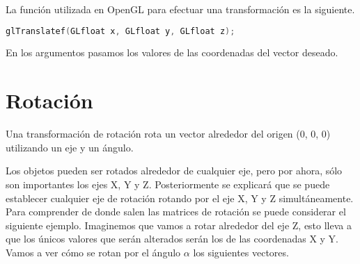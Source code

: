 La función utilizada en OpenGL para efectuar una transformación es la siguiente.
\begin{lstlisting}[language=C]
  glTranslatef(GLfloat x, GLfloat y, GLfloat z);
\end{lstlisting}
En los argumentos pasamos los valores de las coordenadas del vector deseado.

\newpage
\section{Rotación}
Una transformación de rotación rota un vector alrededor del origen (0, 0, 0) utilizando un eje y un ángulo.
\begin{figure} [ht!]
  \centering
\end{figure}

Los objetos pueden ser rotados alrededor de cualquier eje, pero por ahora, sólo son importantes los ejes X, Y y Z. Posteriormente se explicará que se puede establecer cualquier eje de rotación rotando por el eje X, Y y Z simultáneamente.
Para comprender de donde salen las matrices de rotación se puede considerar el siguiente ejemplo. Imaginemos que vamos a rotar alrededor del eje Z, esto lleva a que los únicos valores que serán alterados serán los de las coordenadas X y Y. Vamos a ver cómo se rotan por el ángulo $\alpha$ los siguientes vectores.

